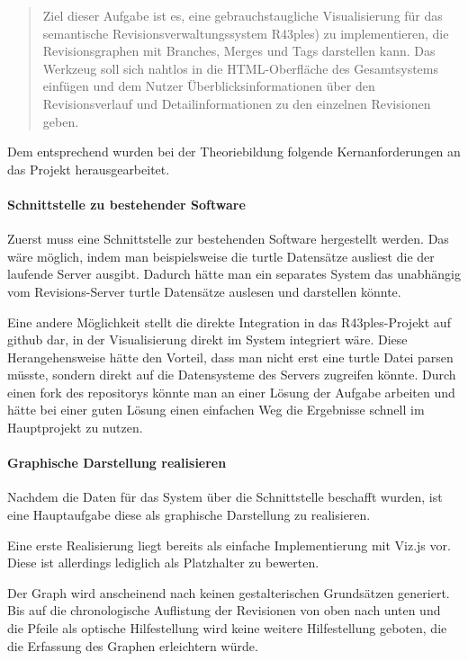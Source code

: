 \documentclass[color, ddc]{tudscrreprt}
\begin{document}
\begin{quotation}
Ziel dieser Aufgabe ist es, eine gebrauchstaugliche Visualisierung für das semantische Revisionsverwaltungssystem R43ples) zu implementieren, die Revisionsgraphen mit Branches, Merges und Tags darstellen kann. Das Werkzeug soll sich nahtlos in die HTML-Oberfläche des Gesamtsystems einfügen und dem Nutzer Überblicksinformationen über den Revisionsverlauf und Detailinformationen zu den einzelnen Revisionen geben.
\end{quotation}

Dem entsprechend wurden bei der Theoriebildung folgende Kernanforderungen an das Projekt herausgearbeitet.

\paragraph{Schnittstelle zu bestehender Software}

Zuerst muss eine Schnittstelle zur bestehenden Software hergestellt werden. Das wäre möglich, indem man beispielsweise die turtle Datensätze ausliest die der laufende Server ausgibt. Dadurch hätte man ein separates System das unabhängig vom Revisions-Server turtle Datensätze auslesen und darstellen könnte.

Eine andere Möglichkeit stellt die direkte Integration in das R43ples-Projekt auf github dar, in der Visualisierung direkt im System integriert wäre. Diese Herangehensweise hätte den Vorteil, dass man nicht erst eine turtle Datei parsen müsste, sondern direkt auf die Datensysteme des Servers zugreifen könnte. Durch einen fork des repositorys könnte man an einer Lösung der Aufgabe arbeiten und hätte bei einer guten Lösung einen einfachen Weg die Ergebnisse schnell im Hauptprojekt zu nutzen.

\paragraph{Graphische Darstellung realisieren}

Nachdem die Daten für das System über die Schnittstelle beschafft wurden, ist eine Hauptaufgabe diese als graphische Darstellung zu realisieren.

Eine erste Realisierung liegt bereits als einfache Implementierung mit Viz.js vor. 
Diese ist allerdings lediglich als Platzhalter zu bewerten.

Der Graph wird anscheinend nach keinen gestalterischen Grundsätzen generiert. Bis auf die chronologische Auflistung der Revisionen von oben nach unten und die Pfeile als optische Hilfestellung wird keine weitere Hilfestellung geboten, die die Erfassung des Graphen erleichtern würde.
\end{document}
